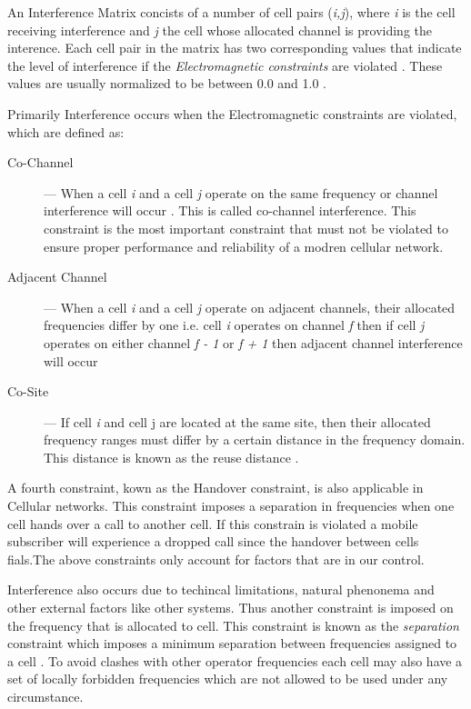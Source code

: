 An Interference Matrix concists of a number of cell pairs (\emph{i,j}), where \emph{i} is the cell receiving interference and \emph{j} the cell whose allocated channel is providing the interence. Each cell pair in the matrix has two corresponding values that indicate the level of interference if the \emph{Electromagnetic constraints} are violated \cite{Eisenblatter,Karen2004,ACOvsEA}. These values are usually normalized to be between 0.0 and 1.0 \cite{AndreasPaper}.

Primarily Interference occurs when the Electromagnetic constraints are violated, which are defined as:
\begin{description}
\item[Co-Channel] --- When a cell \emph{i} and a cell \emph{j} operate on the same frequency or channel interference will occur \cite{Eisenblatter,EfficientEvoChannelManagement,Karen2004,ACOvsEA,InterferenceOrientatedFAP}. This is called co-channel interference. This constraint is the most important constraint that must not be violated to ensure proper performance and reliability of a modren cellular network\cite{EfficientEvoChannelManagement}.
\item[Adjacent Channel] --- When a cell \emph{i} and a cell \emph{j} operate on adjacent channels, their allocated frequencies differ by one i.e. cell \emph{i} operates on channel \emph{f} then if cell \emph{j} operates on either channel \emph{f - 1} or \emph{f + 1} then adjacent channel interference will occur \cite{Eisenblatter,EfficientEvoChannelManagement,Karen2004,ACOvsEA,InterferenceOrientatedFAP}
\item[Co-Site] --- If cell \emph{i} and cell {j} are located at the same site, then their allocated frequency ranges must differ by a certain distance in the frequency domain. This distance is known as the reuse distance \cite{FixedFAPPSO,EgyptFAPPSO}.
\end{description}
A fourth constraint, kown as the Handover constraint, is also applicable in Cellular networks. This constraint imposes a separation in frequencies when one cell hands over a call to another cell. If this constrain is violated a mobile subscriber will experience a dropped call since the handover between cells fials.The above constraints only account for factors that are in our control.

Interference also occurs due to techincal limitations, natural phenonema and other external factors like other systems. Thus another constraint is imposed on the frequency that is allocated to cell. This constraint is known as the \emph{separation} constraint which imposes a minimum separation between frequencies assigned to a cell \cite{Eisenblatter,InterferenceOrientatedFAP}. To avoid clashes with other operator frequencies each cell may also have a set of locally forbidden frequencies which are not allowed to be used under any circumstance.


